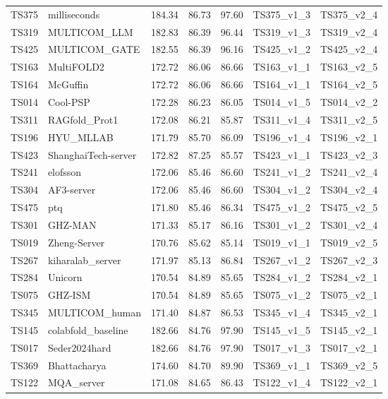 \begin{longtable}{lllllll}
TS375 & milliseconds & 184.34 & 86.73 & 97.60 & TS375\_v1\_3 & TS375\_v2\_4 \\ 
TS319 & MULTICOM\_LLM & 182.83 & 86.39 & 96.44 & TS319\_v1\_3 & TS319\_v2\_4 \\ 
TS425 & MULTICOM\_GATE & 182.55 & 86.39 & 96.16 & TS425\_v1\_2 & TS425\_v2\_4 \\ 
TS163 & MultiFOLD2 & 172.72 & 86.06 & 86.66 & TS163\_v1\_1 & TS163\_v2\_5 \\ 
TS164 & McGuffin & 172.72 & 86.06 & 86.66 & TS164\_v1\_1 & TS164\_v2\_5 \\ 
TS014 & Cool-PSP & 172.28 & 86.23 & 86.05 & TS014\_v1\_5 & TS014\_v2\_2 \\ 
TS311 & RAGfold\_Prot1 & 172.08 & 86.21 & 85.87 & TS311\_v1\_4 & TS311\_v2\_5 \\ 
TS196 & HYU\_MLLAB & 171.79 & 85.70 & 86.09 & TS196\_v1\_4 & TS196\_v2\_1 \\ 
TS423 & ShanghaiTech-server & 172.82 & 87.25 & 85.57 & TS423\_v1\_1 & TS423\_v2\_3 \\ 
TS241 & elofsson & 172.06 & 85.46 & 86.60 & TS241\_v1\_2 & TS241\_v2\_4 \\ 
TS304 & AF3-server & 172.06 & 85.46 & 86.60 & TS304\_v1\_2 & TS304\_v2\_4 \\ 
TS475 & ptq & 171.80 & 85.46 & 86.34 & TS475\_v1\_2 & TS475\_v2\_5 \\ 
TS301 & GHZ-MAN & 171.33 & 85.17 & 86.16 & TS301\_v1\_2 & TS301\_v2\_4 \\ 
TS019 & Zheng-Server & 170.76 & 85.62 & 85.14 & TS019\_v1\_1 & TS019\_v2\_5 \\ 
TS267 & kiharalab\_server & 171.97 & 85.13 & 86.84 & TS267\_v1\_2 & TS267\_v2\_3 \\ 
TS284 & Unicorn & 170.54 & 84.89 & 85.65 & TS284\_v1\_2 & TS284\_v2\_1 \\ 
TS075 & GHZ-ISM & 170.54 & 84.89 & 85.65 & TS075\_v1\_2 & TS075\_v2\_1 \\ 
TS345 & MULTICOM\_human & 171.40 & 84.87 & 86.53 & TS345\_v1\_4 & TS345\_v2\_1 \\ 
TS145 & colabfold\_baseline & 182.66 & 84.76 & 97.90 & TS145\_v1\_5 & TS145\_v2\_1 \\ 
TS017 & Seder2024hard & 182.66 & 84.76 & 97.90 & TS017\_v1\_3 & TS017\_v2\_1 \\ 
TS369 & Bhattacharya & 174.60 & 84.70 & 89.90 & TS369\_v1\_1 & TS369\_v2\_5 \\ 
TS122 & MQA\_server & 171.08 & 84.65 & 86.43 & TS122\_v1\_4 & TS122\_v2\_1 \\ 

\end{longtable}
